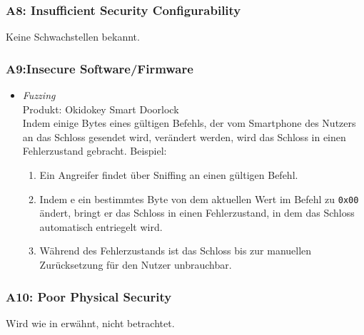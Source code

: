     \subsubsection*{A8: Insufficient Security Configurability}
        Keine Schwachstellen bekannt.
        
    \subsubsection*{A9:Insecure Software/Firmware}
        \begin{itemize}[leftmargin=0cm,label={}]
            \item \emph{Fuzzing}\cite{Rose2016}\label{vuln:fuzzing}\\
                Produkt: Okidokey Smart Doorlock\\
                Indem einige Bytes eines gültigen Befehls, der vom Smartphone des Nutzers an das Schloss gesendet wird, verändert werden, wird das Schloss in einen Fehlerzustand gebracht.
    	        Beispiel:
    	        \begin{enumerate}[noitemsep]
    	            \item Ein Angreifer findet über Sniffing an einen gültigen Befehl.
    	            \item Indem e ein bestimmtes Byte von dem aktuellen Wert im Befehl zu \colorbox{light-gray}{\lstinline{0x00}} ändert, bringt er das Schloss in einen Fehlerzustand, in dem das Schloss automatisch entriegelt wird.
    	            \item Während des Fehlerzustands ist das Schloss bis zur manuellen Zurücksetzung für den Nutzer unbrauchbar.
    	        \end{enumerate} 
        \end{itemize}
        
    \newpage
    \subsubsection*{A10: Poor Physical Security}
        Wird wie in  erwähnt, nicht betrachtet.
    